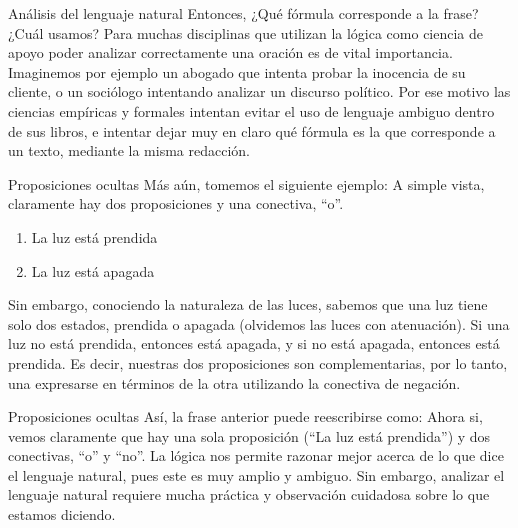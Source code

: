 
\begin{frame}{Análisis del lenguaje natural}
  Entonces, ¿Qué fórmula corresponde a la frase? ¿Cuál usamos?
  \jump
  Para muchas disciplinas que utilizan la lógica como ciencia de apoyo poder
  analizar correctamente una oración es de vital importancia.
  \jump
  Imaginemos por ejemplo un abogado que intenta probar la inocencia de su
  cliente, o un sociólogo intentando analizar un discurso político.
  \jump
  Por ese motivo las ciencias empíricas y formales intentan evitar el uso de
  lenguaje ambiguo dentro de sus libros, e intentar dejar muy en claro qué
  fórmula es la que corresponde a un texto, mediante la misma redacción.
\end{frame}


\begin{frame}{Proposiciones ocultas}
  Más aún, tomemos el siguiente ejemplo:
  \jump
  \jump
  A simple vista, claramente hay dos proposiciones y una conectiva, ``o''.
  \begin{enumerate}
    \item La luz está prendida
    \item La luz está apagada
  \end{enumerate}
  \jump
  Sin embargo, conociendo la naturaleza de las luces, sabemos que una luz tiene
  solo dos estados, prendida o apagada (olvidemos las luces con atenuación). Si
  una luz no está prendida, entonces está apagada, y si no está apagada, entonces
  está prendida.
  \jump
  Es decir, nuestras dos proposiciones son complementarias, por lo tanto, una
  expresarse en términos de la otra utilizando la conectiva de negación.
\end{frame}


\begin{frame}{Proposiciones ocultas}
  Así, la frase anterior puede reescribirse como:
  \jump
  \jump
  Ahora si, vemos claramente que hay una sola proposición (``La luz está prendida'')
  y dos conectivas, ``o'' y ``no''.
  \jump
  La lógica nos permite razonar mejor acerca de lo que dice el lenguaje natural,
  pues este es muy amplio y ambiguo. Sin embargo, analizar el lenguaje natural
  requiere mucha práctica y observación cuidadosa sobre lo que estamos diciendo.
\end{frame}

